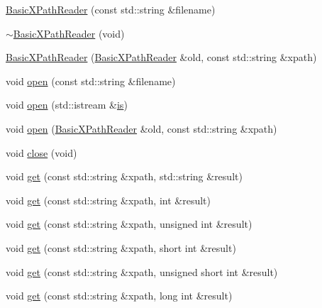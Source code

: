 \begin{DoxyCompactItemize}
\mbox{\hyperlink{classXMLXPathReader_1_1BasicXPathReader_a57cb0e2be2731944bc6a04cd9074676e}{Basic\+X\+Path\+Reader}} (const std\+::string \&filename)
\item 
\mbox{\hyperlink{classXMLXPathReader_1_1BasicXPathReader_a68ea0f431941d0c9d1a0272866ae74d5}{$\sim$\+Basic\+X\+Path\+Reader}} (void)
\item 
\mbox{\hyperlink{classXMLXPathReader_1_1BasicXPathReader_aa3addfb7d74ed5930b9d2c0b55216227}{Basic\+X\+Path\+Reader}} (\mbox{\hyperlink{classXMLXPathReader_1_1BasicXPathReader}{Basic\+X\+Path\+Reader}} \&old, const std\+::string \&xpath)
\item 
void \mbox{\hyperlink{classXMLXPathReader_1_1BasicXPathReader_a0c3b7c392c0646fe682af255a0242a8c}{open}} (const std\+::string \&filename)
\item 
void \mbox{\hyperlink{classXMLXPathReader_1_1BasicXPathReader_a48dbc690810bf8649486892c9385dbe6}{open}} (std\+::istream \&\mbox{\hyperlink{x_8cc_a81abbbdef81e25584a2eab888e643d3d}{is}})
\item 
void \mbox{\hyperlink{classXMLXPathReader_1_1BasicXPathReader_ae01eda40079a5afeee9bbdf23b316a61}{open}} (\mbox{\hyperlink{classXMLXPathReader_1_1BasicXPathReader}{Basic\+X\+Path\+Reader}} \&old, const std\+::string \&xpath)
\item 
void \mbox{\hyperlink{classXMLXPathReader_1_1BasicXPathReader_acab41ee6353e8d7289d9c28828f9ceb6}{close}} (void)
\item 
void \mbox{\hyperlink{classXMLXPathReader_1_1BasicXPathReader_a3498d5a0bf7d47094e2d8f7d81e629af}{get}} (const std\+::string \&xpath, std\+::string \&result)
\item 
void \mbox{\hyperlink{classXMLXPathReader_1_1BasicXPathReader_adffe50d2d1617b1a1769e6df0e64b33f}{get}} (const std\+::string \&xpath, int \&result)
\item 
void \mbox{\hyperlink{classXMLXPathReader_1_1BasicXPathReader_a9af23697d080af9b12c4aa3f85349646}{get}} (const std\+::string \&xpath, unsigned int \&result)
\item 
void \mbox{\hyperlink{classXMLXPathReader_1_1BasicXPathReader_a1c7190f83ff84ffa9693a34d59209347}{get}} (const std\+::string \&xpath, short int \&result)
\item 
void \mbox{\hyperlink{classXMLXPathReader_1_1BasicXPathReader_ac41b025610dc647d7cd6bbad47b08da2}{get}} (const std\+::string \&xpath, unsigned short int \&result)
\item 
void \mbox{\hyperlink{classXMLXPathReader_1_1BasicXPathReader_a59f6dda508a46d6df29478782ff22a10}{get}} (const std\+::string \&xpath, long int \&result)

\end{DoxyCompactItemize}
